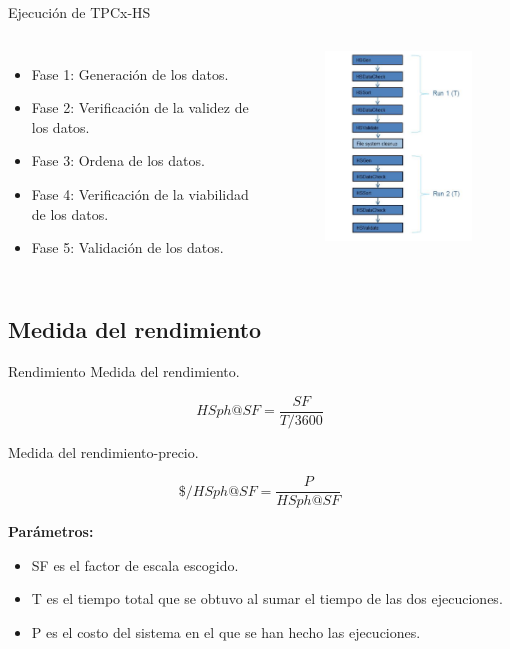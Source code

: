 		\begin{frame}{Ejecución de TPCx-HS}
				\begin{columns}[c]
					
					\begin{itemize}
						\item Fase 1: Generación de los datos.
						\item Fase 2: Verificación de la validez de los datos.
						\item Fase 3: Ordena de los datos.
						\item Fase 4: Verificación de la viabilidad de los datos.
						\item Fase 5: Validación de los datos.
					\end{itemize}
					
					\begin{figure}[H]
						\centering
						\includegraphics[width=5cm]{./Images/executionsTPC.png}
					\end{figure}

				\end{columns}
	
		\end{frame}
		
	\subsection*{Medida del rendimiento}	
			
		\begin{frame}{Rendimiento}		
			{\color{ChetwodeBlue}\large Medida del rendimiento.}
								
					$$ HSph@SF = \frac{SF}{T/3600} $$				
				
			{\color{ChetwodeBlue}\large Medida del rendimiento-precio.}
			
					$$ \$/HSph@SF = \frac{P}{HSph@SF} $$
					
			\begin{tcolorbox}[colback=blue!5,colframe=blue!15]
				\textbf{Parámetros:}

				\fontsize{10}{8}\selectfont		
				\begin{itemize}
					\item SF es el factor de escala escogido.
					\item T es el tiempo total que se obtuvo al sumar el tiempo de las dos ejecuciones.
					\item P es el costo del sistema en el que se han hecho las ejecuciones.
				\end{itemize}
			\end{tcolorbox}
		\end{frame}
				 